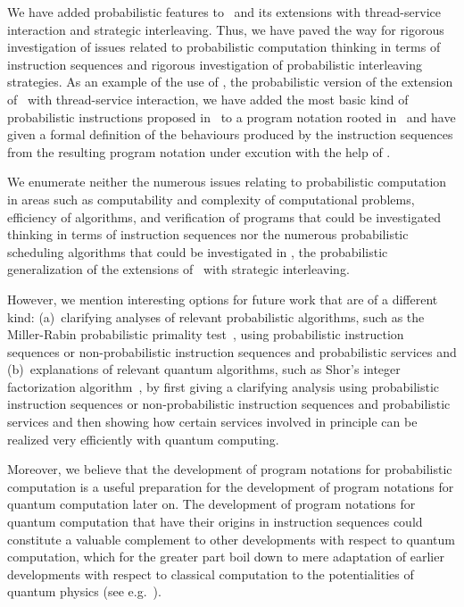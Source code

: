 \documentclass{llncs}
\begin{document}
We have added probabilistic features to \BTA\ and its extensions with 
thread-service interaction and strategic interleaving.
Thus, we have paved the way for rigorous investigation of issues related
to probabilistic computation thinking in terms of instruction sequences
and rigorous investigation of probabilistic interleaving strategies.
As an example of the use of \prTSI, the probabilistic version of the 
extension of \BTA\ with thread-service interaction, we have added the 
most basic kind of probabilistic instructions proposed in~\cite{BM09f} 
to a program notation rooted in \PGA\ and have given a formal definition 
of the behaviours produced by the instruction sequences from the 
resulting program notation under excution with the help of \prTSI.

We enumerate neither the numerous issues relating to probabilistic 
computation in areas such as computability and complexity of 
computational problems, efficiency of algorithms, and verification of 
programs that could be investigated thinking in terms of instruction 
sequences nor the numerous probabilistic scheduling algorithms that 
could be investigated in \prTA, the probabilistic generalization of the 
extensions of \BTA\ with strategic interleaving.

However, we mention interesting options for future work that are of a 
different kind:
(a)~clarifying analyses of relevant probabilistic algorithms, such as 
the Miller-Rabin probabilistic primality test~\cite{Rab76a}, using 
probabilistic instruction sequences or non-probabilistic instruction 
sequences and probabilistic services and
(b)~explanations of relevant quantum algorithms, such as Shor's integer
factorization algorithm~\cite{Sho94a}, by first giving a clarifying
analysis using probabilistic instruction sequences or non-probabilistic 
instruction sequences and probabilistic services and then showing how 
certain services involved in principle can be realized very efficiently 
with quantum computing.

Moreover, we believe that the development of program notations for 
probabilistic computation is a useful preparation for the development of 
program notations for quantum computation later on.
The development of program notations for quantum computation that have 
their origins in instruction sequences could constitute a valuable 
complement to other developments with respect to quantum computation, 
which for the greater part boil down to mere adaptation of earlier 
developments with respect to classical computation to the potentialities 
of quantum physics (see e.g.~\cite{Gay06a}).
\end{document}
